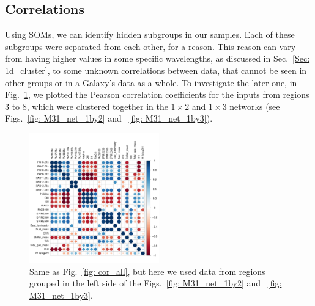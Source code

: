         
    \subsection{Correlations}%
        Using SOMs, we can identify hidden subgroups in our samples. %
        Each of these subgroups were separated from each other, for a reason.
        This reason can vary from having higher values in some specific wavelengths, as discussed in Sec.~\ref{Sec: 1d_cluster}, to some unknown correlations between data, that cannot be seen in other groups or in a Galaxy's data as a whole.
        To investigate the later one, in Fig.~\ref{fig: cor_cluster1}, we plotted the Pearson correlation coefficients for the inputs from regions 3 to 8, which were clustered together in the $1\times2$ and $1\times3$ networks (see Figs.~\ref{fig: M31_net_1by2} and ~\ref{fig: M31_net_1by3}).
        
        \begin{figure}
        \includegraphics[width=0.5\textwidth]{../images0.01/cor_plots/M31_derived_3_to_8_core_plot_for_paper.pdf}%
        \caption{Same as Fig.~\ref{fig: cor_all}, but here we used data from regions grouped in the left side of the Figs.~\ref{fig: M31_net_1by2} and ~\ref{fig: M31_net_1by3}. }
          \label{fig: cor_cluster1}
        \end{figure}
        
